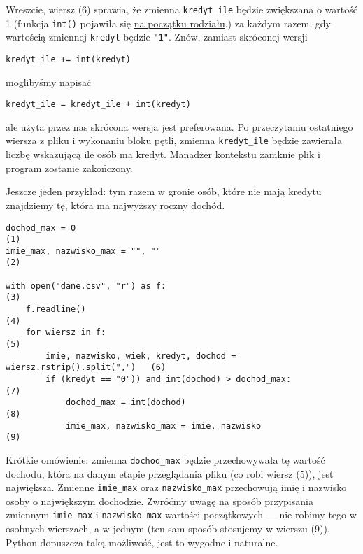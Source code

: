 \documentclass[a4paper]{article}
\begin{document}
Wreszcie, wiersz (6) sprawia, że zmienna \texttt{kredyt\_ile} będzie zwiększana
o wartość 1 (funkcja \lstinline|int()| pojawiła się \hyperref[int-oraz-float]{na początku rodziału}.) za każdym razem, gdy wartością zmiennej \texttt{kredyt} będzie \texttt{"1"}. Znów, zamiast skróconej wersji

\lstinline|kredyt_ile += int(kredyt)|

moglibyśmy napisać

\lstinline|kredyt_ile = kredyt_ile + int(kredyt)|

ale użyta przez nas skrócona wersja jest preferowana. Po przeczytaniu ostatniego wiersza z pliku i wykonaniu bloku pętli, zmienna \texttt{kredyt\_ile} będzie zawierała liczbę wskazującą ile osób ma kredyt. Manadżer kontekstu zamknie plik i program zostanie zakończony.

Jeszcze jeden przykład: tym razem w gronie osób, które nie mają kredytu znajdziemy tę, która ma najwyższy roczny dochód.

\begin{verbatim}
dochod_max = 0                                                              (1)
imie_max, nazwisko_max = "", ""                                             (2)

with open("dane.csv", "r") as f:                                            (3)
    f.readline()                                                            (4)
    for wiersz in f:                                                        (5)
        imie, nazwisko, wiek, kredyt, dochod = wiersz.rstrip().split(",")   (6)
        if (kredyt == "0")) and int(dochod) > dochod_max:                   (7)
            dochod_max = int(dochod)                                        (8)
            imie_max, nazwisko_max = imie, nazwisko                         (9)

\end{verbatim}

Krótkie omówienie: zmienna \texttt{dochod\_max} będzie przechowywała tę wartość dochodu, która na danym etapie przeglądania pliku (co robi wiersz (5)), jest największa. Zmienne \texttt{imie\_max} oraz \texttt{nazwisko\_max} przechowują imię i nazwisko osoby o największym dochodzie. Zwróćmy uwagę na sposób przypisania zmiennym \texttt{imie\_max} i \texttt{nazwisko\_max} wartości początkowych --- nie robimy tego w osobnych wierszach, a w jednym (ten sam sposób stosujemy w wierszu (9)). Python dopuszcza taką możliwość, jest to wygodne i naturalne.
\end{document}
